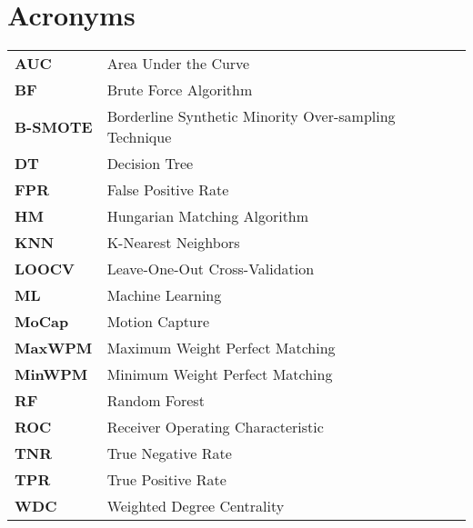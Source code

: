 \section*{\Huge Acronyms}

\begin{table}[H]
    \renewcommand{\arraystretch}{1.5} %
    \setlength{\tabcolsep}{20pt}
    \begin{tabular}{l l} 
        \textbf{AUC} & Area Under the Curve \\
        \textbf{BF} & Brute Force Algorithm \\
        \textbf{B-SMOTE} & Borderline Synthetic Minority Over-sampling Technique \\
        \textbf{DT} & Decision Tree \\
        \textbf{FPR} & False Positive Rate \\
        \textbf{HM} & Hungarian Matching Algorithm \\
        \textbf{KNN} & K-Nearest Neighbors \\
        \textbf{LOOCV} & Leave-One-Out Cross-Validation \\
        \textbf{ML} & Machine Learning \\
        \textbf{MoCap} & Motion Capture \\
        \textbf{MaxWPM} & Maximum Weight Perfect Matching \\
        \textbf{MinWPM} & Minimum Weight Perfect Matching \\
        \textbf{RF} & Random Forest \\
        \textbf{ROC} & Receiver Operating Characteristic \\
        \textbf{TNR} & True Negative Rate \\
        \textbf{TPR} & True Positive Rate \\
        \textbf{WDC} & Weighted Degree Centrality \\
    \end{tabular}
\end{table}

